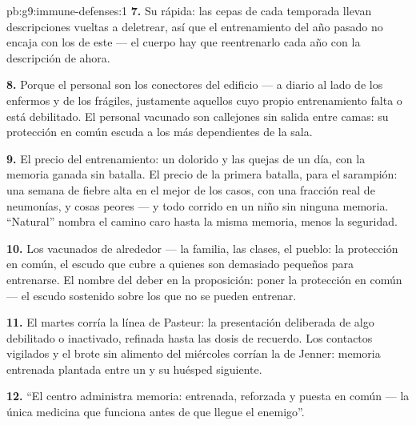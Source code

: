 \begin{solution}{pb:g9:immune-defenses:1}
\textbf{7.} Su  rápida: las cepas de cada temporada llevan
descripciones vueltas a deletrear, así que el entrenamiento del año
pasado no encaja con los  de este --- el cuerpo hay que
reentrenarlo cada año con la descripción de ahora.

\textbf{8.} Porque el personal son los conectores del edificio --- a
diario al lado de los enfermos y de los frágiles, justamente aquellos
cuyo propio entrenamiento falta o está debilitado. El personal vacunado
son callejones sin salida entre camas: su protección en común escuda a
los más dependientes de la sala.

\textbf{9.} El precio del entrenamiento: un  dolorido y las
quejas de un día, con la memoria ganada sin batalla. El precio de la
primera batalla, para el sarampión: una semana de fiebre alta en el
mejor de los casos, con una fracción real de neumonías, y cosas peores
--- y todo corrido en un niño sin ninguna memoria. ``Natural'' nombra
el camino caro hasta la misma memoria, menos la seguridad.

\textbf{10.} Los vacunados de alrededor --- la familia, las clases, el
pueblo: la protección en común, el escudo que cubre a quienes son
demasiado pequeños para entrenarse. El nombre del deber en la
proposición: poner la protección en común --- el escudo sostenido sobre
los que no se pueden entrenar.

\textbf{11.} El martes corría la línea de Pasteur: la presentación
deliberada de algo debilitado o inactivado, refinada hasta las dosis de
recuerdo. Los contactos vigilados y el brote sin alimento del miércoles
corrían la de Jenner: memoria entrenada plantada entre un  y su
huésped siguiente.

\textbf{12.} ``El centro administra memoria: entrenada, reforzada y
puesta en común --- la única medicina que funciona antes de que llegue
el enemigo''.
\end{solution}
